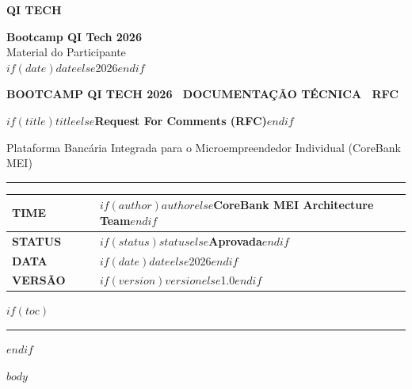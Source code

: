 \documentclass[11pt,a4paper]{article}
\begin{document}
\noindent
\begin{minipage}[t]{0.5\textwidth}
  {\Large\bfseries\color{primary} QI TECH} \quad {\color{accent}\rule{1.5pt}{14pt}} 
\end{minipage}
\hfill
\begin{minipage}[t]{0.45\textwidth}
  \raggedleft\footnotesize\color{textgray}
  \textbf{Bootcamp QI Tech 2026} \\
  Material do Participante \\
  $if(date)$$date$$else$2026$endif$
\end{minipage}

\vspace{12pt}
{\footnotesize\bfseries\color{accent} BOOTCAMP QI TECH 2026 \textbullet\ DOCUMENTAÇÃO TÉCNICA \textbullet\ RFC}
\vspace{4pt}

{\LARGE\bfseries\color{primary} $if(title)$$title$$else$Request For Comments (RFC)$endif$}
\vspace{4pt}

{\small\color{textgray} Plataforma Bancária Integrada para o Microempreendedor Individual (CoreBank MEI)}

\vspace{8pt}
{\color{primary}\rule{\linewidth}{2.2pt}}
\vspace{10pt}

\noindent
\begin{tabular}{@{}p{0.22\linewidth} p{0.78\linewidth}@{}}
  \toprule
  \textbf{\color{textgray}\footnotesize TIME} & \small $if(author)$$author$$else$CoreBank MEI Architecture Team$endif$ \\
  \midrule
  \textbf{\color{textgray}\footnotesize STATUS} & \small \textbf{\color{primary}$if(status)$$status$$else$Aprovada$endif$} \\
  \midrule
  \textbf{\color{textgray}\footnotesize DATA} & \small $if(date)$$date$$else$2026$endif$ \\
  \midrule
  \textbf{\color{textgray}\footnotesize VERSÃO} & \small $if(version)$$version$$else$1.0$endif$ \\
  \bottomrule
\end{tabular}

\vspace{12pt}

$if(toc)$
{
  \hypersetup{linkcolor=primary}
  \setcounter{tocdepth}{2}
  \tableofcontents
}
\vspace{14pt}
{\color{bordergray}\hrule}
\vspace{14pt}
$endif$

$body$
\end{document}
